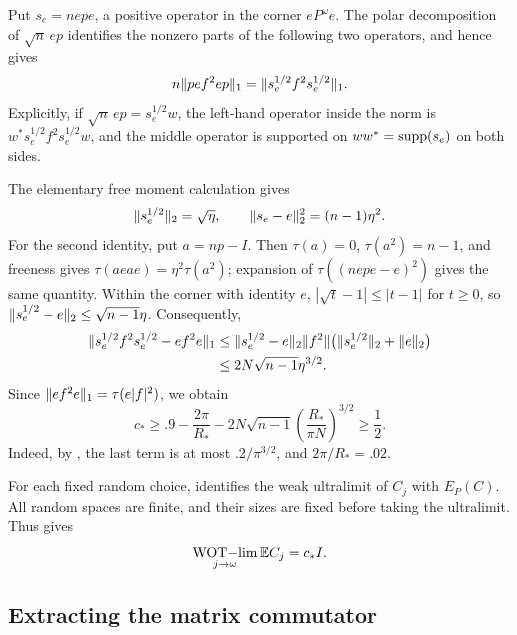 Put \(s_e=nepe\), a positive operator in the corner \(eP^\omega e\).
The polar decomposition of \(\sqrt n\,ep\) identifies the nonzero
parts of the following two operators, and hence gives
\begin{equation}\label{eq:compression-polar}
 n\lVert pef^2ep\rVert_1
 =\lVert s_e^{1/2}f^2s_e^{1/2}\rVert_1.
\end{equation}
Explicitly, if \(\sqrt n\,ep=s_e^{1/2}w\), the left-hand operator
inside the norm is
\(w^*s_e^{1/2}f^2s_e^{1/2}w\), and the middle operator is supported
on \(ww^*=\operatorname{supp}(s_e)\) on both sides.

The elementary free moment calculation gives
\[
 \lVert s_e^{1/2}\rVert_2=\sqrt\eta,\qquad
 \lVert s_e-e\rVert_2^2=(n-1)\eta^2.
\]
For the second identity, put \(a=np-I\). Then
\(\tau(a)=0\), \(\tau(a^2)=n-1\), and freeness gives
\(\tau(aeae)=\eta^2\tau(a^2)\); expansion of
\(\tau((nepe-e)^2)\) gives the same quantity.
Within the corner with identity \(e\),
\(|\sqrt t-1|\le|t-1|\) for \(t\ge0\), so
\(\lVert s_e^{1/2}-e\rVert_2\le\sqrt{n-1}\eta\).
Consequently,
\begin{align*}
 \lVert s_e^{1/2}f^2s_e^{1/2}-ef^2e\rVert_1
 &\le\lVert s_e^{1/2}-e\rVert_2\lVert f^2\rVert
       \bigl(\lVert s_e^{1/2}\rVert_2+\lVert e\rVert_2\bigr)\\
 &\le2N\sqrt{n-1}\eta^{3/2}.
\end{align*}
Since \(\lVert ef^2e\rVert_1=\tau(e|f|^2)\), we obtain
\begin{equation}\label{eq:positive-scalar}
 c_*\ge .9-\frac{2\pi}{R_*}
       -2N\sqrt{n-1}\left(\frac{R_*}{\pi N}\right)^{3/2}
 \ge\frac12.
\end{equation}
Indeed, by , the last term is at most
\(.2/\pi^{3/2}\), and \(2\pi/R_*=.02\).

For each fixed random choice,  identifies
the weak ultralimit of \(C_j\) with \(E_P(C)\).
All random spaces are finite, and their sizes are fixed before
taking the ultralimit. Thus  gives
\begin{equation}\label{eq:weak-scalar-limit}
 \underset{j\to\omega}{\operatorname{WOT}\!-\!\lim}\,\mathbb E C_j=c_*I.
\end{equation}

\subsection{Extracting the matrix commutator}

